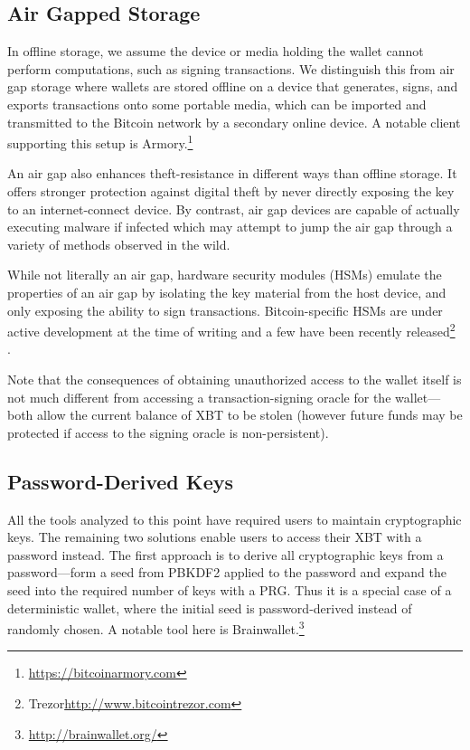 \subsection{Air Gapped Storage}

In offline storage, we assume the device or media holding the wallet cannot perform computations, such as signing transactions. We distinguish this from air gap storage where wallets are stored offline on a device that generates, signs, and exports transactions onto some portable media, which can be imported and transmitted to the Bitcoin network by a secondary online device. A notable client supporting this setup is Armory.\footnote{\url{https://bitcoinarmory.com}} 

An air gap also enhances theft-resistance in different ways than offline storage. It offers stronger protection against digital theft by never directly exposing the key to an internet-connect device. By contrast, air gap devices are capable of actually executing malware if infected which may attempt to jump the air gap through a variety of methods observed in the wild.

While not literally an air gap, hardware security modules (HSMs) emulate the properties of an air gap by isolating the key material from the host device, and only exposing the ability to sign transactions. Bitcoin-specific HSMs are under active development at the time of writing and a few have been recently released\footnote{Trezor\url{http://www.bitcointrezor.com}} .

Note that the consequences of obtaining unauthorized access to the wallet itself is not much different from accessing a transaction-signing oracle for the wallet---both allow the current balance of XBT to be stolen (however future funds may be protected if access to the signing oracle is non-persistent). 


\subsection{Password-Derived Keys} 
All the tools analyzed to this point have required users to maintain cryptographic keys. The remaining two solutions enable users to access their XBT with a password instead. The first approach is to derive all cryptographic keys from a password---\eg form a seed from PBKDF2 applied to the password and expand the seed into the required number of keys with a PRG. Thus it is a special case of a deterministic wallet, where the initial seed is password-derived instead of randomly chosen. A notable tool here is Brainwallet.\footnote{\url{http://brainwallet.org/}}

